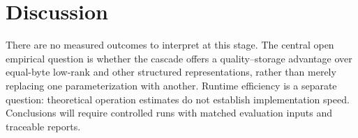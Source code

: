 \section{Discussion}
There are no measured outcomes to interpret at this stage. The central open empirical question is whether the cascade offers a quality--storage advantage over equal-byte low-rank and other structured representations, rather than merely replacing one parameterization with another. Runtime efficiency is a separate question: theoretical operation estimates do not establish implementation speed. Conclusions will require controlled runs with matched evaluation inputs and traceable reports.
